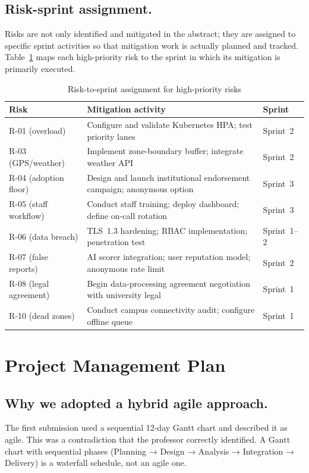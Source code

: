 \documentclass[12pt,a4paper]{article}
\begin{document}
\subsection{Risk-sprint assignment.}
Risks are not only identified and mitigated in the abstract; they
are assigned to specific sprint activities so that mitigation work
is actually planned and tracked. Table~\ref{tab:risksprinttrace}
maps each high-priority risk to the sprint in which its mitigation
is primarily executed.

\begin{table}[h]
\caption{Risk-to-sprint assignment for high-priority risks}
\label{tab:risksprinttrace}
\centering
\begin{tabularx}{\textwidth}{lXl}
\toprule
\textbf{Risk} & \textbf{Mitigation activity} & \textbf{Sprint} \\
\midrule
R-01 (overload) & Configure and validate Kubernetes HPA; test priority lanes & Sprint~2 \\
R-03 (GPS/weather) & Implement zone-boundary buffer; integrate weather API & Sprint~2 \\
R-04 (adoption floor) & Design and launch institutional endorsement campaign; anonymous option & Sprint~3 \\
R-05 (staff workflow) & Conduct staff training; deploy dashboard; define on-call rotation & Sprint~3 \\
R-06 (data breach) & TLS~1.3 hardening; RBAC implementation; penetration test & Sprint~1--2 \\
R-07 (false reports) & AI scorer integration; user reputation model; anonymous rate limit & Sprint~2 \\
R-08 (legal agreement) & Begin data-processing agreement negotiation with university legal & Sprint~1 \\
R-10 (dead zones) & Conduct campus connectivity audit; configure offline queue & Sprint~1 \\
\bottomrule
\end{tabularx}
\end{table}

\section{Project Management Plan}
\label{sec:pm}

\subsection{Why we adopted a hybrid agile approach.}
The first submission used a sequential 12-day Gantt chart and
described it as agile. This was a contradiction that the professor
correctly identified. A Gantt chart with sequential phases
(Planning → Design → Analysis → Integration → Delivery) is a
waterfall schedule, not an agile one.
\end{document}
